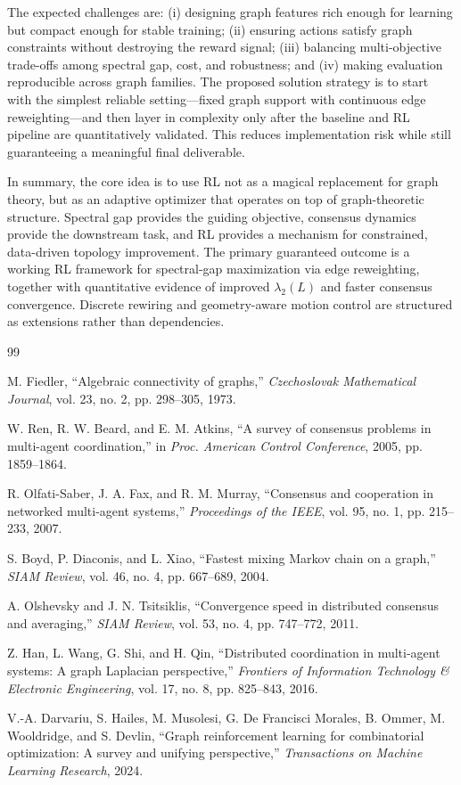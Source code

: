 \documentclass[letterpaper, 11 pt, journal, twoside]{IEEEtran}
\begin{document}
The expected challenges are: (i) designing graph features rich enough for learning but compact enough for stable training; (ii) ensuring actions satisfy graph constraints without destroying the reward signal; (iii) balancing multi-objective trade-offs among spectral gap, cost, and robustness; and (iv) making evaluation reproducible across graph families. The proposed solution strategy is to start with the simplest reliable setting---fixed graph support with continuous edge reweighting---and then layer in complexity only after the baseline and RL pipeline are quantitatively validated. This reduces implementation risk while still guaranteeing a meaningful final deliverable.

In summary, the core idea is to use RL not as a magical replacement for graph theory, but as an adaptive optimizer that operates on top of graph-theoretic structure. Spectral gap provides the guiding objective, consensus dynamics provide the downstream task, and RL provides a mechanism for constrained, data-driven topology improvement. The primary guaranteed outcome is a working RL framework for spectral-gap maximization via edge reweighting, together with quantitative evidence of improved $\lambda_2(L)$ and faster consensus convergence. Discrete rewiring and geometry-aware motion control are structured as extensions rather than dependencies.

\begin{thebibliography}{99}

M. Fiedler, ``Algebraic connectivity of graphs,'' \emph{Czechoslovak Mathematical Journal}, vol. 23, no. 2, pp. 298--305, 1973.

W. Ren, R. W. Beard, and E. M. Atkins, ``A survey of consensus problems in multi-agent coordination,'' in \emph{Proc. American Control Conference}, 2005, pp. 1859--1864.

R. Olfati-Saber, J. A. Fax, and R. M. Murray, ``Consensus and cooperation in networked multi-agent systems,'' \emph{Proceedings of the IEEE}, vol. 95, no. 1, pp. 215--233, 2007.

S. Boyd, P. Diaconis, and L. Xiao, ``Fastest mixing Markov chain on a graph,'' \emph{SIAM Review}, vol. 46, no. 4, pp. 667--689, 2004.

A. Olshevsky and J. N. Tsitsiklis, ``Convergence speed in distributed consensus and averaging,'' \emph{SIAM Review}, vol. 53, no. 4, pp. 747--772, 2011.

Z. Han, L. Wang, G. Shi, and H. Qin, ``Distributed coordination in multi-agent systems: A graph Laplacian perspective,'' \emph{Frontiers of Information Technology \& Electronic Engineering}, vol. 17, no. 8, pp. 825--843, 2016.

V.-A. Darvariu, S. Hailes, M. Musolesi, G. De Francisci Morales, B. Ommer, M. Wooldridge, and S. Devlin, ``Graph reinforcement learning for combinatorial optimization: A survey and unifying perspective,'' \emph{Transactions on Machine Learning Research}, 2024.

\end{thebibliography}
\end{document}
